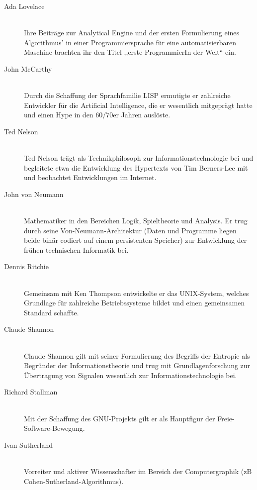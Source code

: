 \begin{description}
  \item[Ada Lovelace ] \hfill{} \\
    Ihre Beiträge zur Analytical Engine und der ersten Formulierung eines Algorithmus' in einer Programmiersprache für eine automatisierbaren Maschine brachten ihr den Titel ,,erste ProgrammierIn der Welt`` ein.

  \item[John McCarthy ] \hfill{} \\
    Durch die Schaffung der Sprachfamilie LISP ermutigte er zahlreiche Entwickler für die Artificial Intelligence, die er wesentlich mitgeprägt hatte und einen Hype in den 60/70er Jahren auslöste.

  \item[Ted Nelson ] \hfill{} \\
    Ted Nelson trägt als Technikphilosoph zur Informationstechnologie bei und begleitete etwa die Entwicklung des Hypertexts von Tim Berners-Lee mit und beobachtet Entwicklungen im Internet.

  \item[John von Neumann ] \hfill{} \\
    Mathematiker in den Bereichen Logik, Spieltheorie und Analysis. Er trug durch seine Von-Neumann-Architektur (Daten und Programme liegen beide binär codiert auf einem persistenten Speicher) zur Entwicklung der frühen technischen Informatik bei.

  \item[Dennis Ritchie ] \hfill{} \\
    Gemeinsam mit Ken Thompson entwickelte er das UNIX-System, welches Grundlage für zahlreiche Betriebssysteme bildet und einen gemeinsamen Standard schaffte.

  \item[Claude Shannon ] \hfill{} \\
    Claude Shannon gilt mit seiner Formulierung des Begriffs der Entropie als Begründer der Informationstheorie und trug mit Grundlagenforschung zur Übertragung von Signalen wesentlich zur Informationstechnologie bei.

  \item[Richard Stallman ] \hfill{} \\
    Mit der Schaffung des GNU-Projekts gilt er als Hauptfigur der Freie-Software-Bewegung.

  \item[Ivan Sutherland ] \hfill{} \\
    Vorreiter und aktiver Wissenschafter im Bereich der Computergraphik (zB Cohen-Sutherland-Algorithmus).


\end{description}
